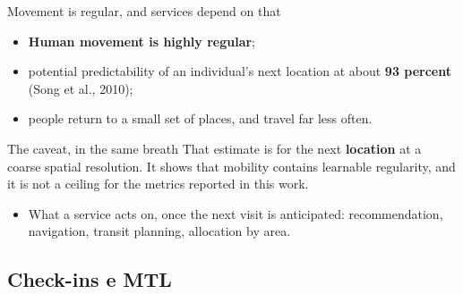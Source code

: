 \documentclass{beamer}
\begin{document}
\begin{frame}{Movement is regular, and services depend on that}
    \begin{itemize}
        \item \textbf{Human movement is highly regular};
        \item potential predictability of an individual's next location at about
              \textbf{93 percent} (Song et al., 2010);
        \item people return to a small set of places, and travel far less often.
    \end{itemize}

    \bigskip
    \begin{alertblock}{The caveat, in the same breath}
        \small
        That estimate is for the next \textbf{location} at a coarse spatial resolution. It shows
        that mobility contains learnable regularity, and it is \alert{not a ceiling} for the
        metrics reported in this work.
    \end{alertblock}

    \medskip
    \begin{itemize}
        \item What a service acts on, once the next visit is anticipated: recommendation,
              navigation, transit planning, allocation by area.
    \end{itemize}
\end{frame}

\subsection{Check-ins e MTL}
\end{document}

